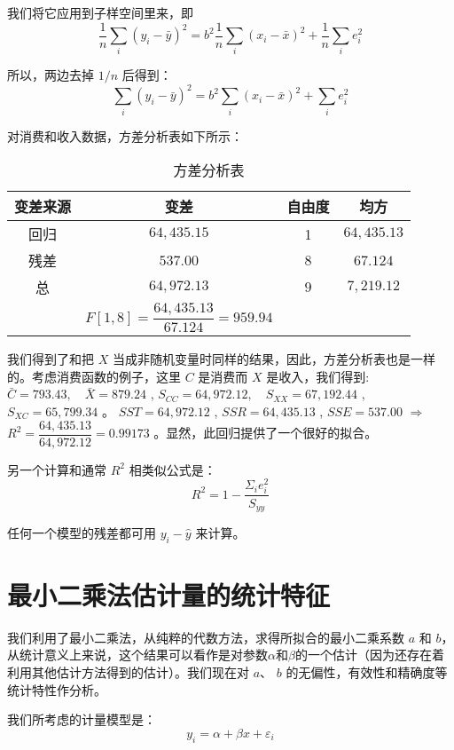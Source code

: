 我们将它应用到子样空间里来，即
$$ \frac{1}{n} \sum_{i}\left(y_{i}-\bar{y}\right)^{2}=b^{2} \frac{1}{n} \sum_{i}\left(x_{i}-\bar{x}\right)^{2}+\frac{1}{n} \sum_{i} e_{i}^{2} $$

所以，两边去掉 $ 1/n $ 后得到：
$$ \sum_{i}\left(y_{i}-\bar{y}\right)^{2}=b^{2} \sum_{i}\left(x_{i}-\bar{x}\right)^{2}+\sum_{i} e_{i}^{2} $$

对消费和收入数据，方差分析表如下所示：
\begin{table}[htb!]
    \centering
    \caption{方差分析表}
    \begin{tabular}{cccc}
        \hline 变差来源 & 变差 & 自由度 & 均方 \\
        \hline 回归 & $64,435.15$ & 1 & $ 64,435.13$ \\
        残差 & $537.00$ &  $8$ & $67.124$ \\
        总 & $64,972.13$ & $9$ & $7,219.12$  \vspace{0.3em} \\
         & $F[1, 8]=\dfrac{64,435.13}{67.124} = 959.94$ &  \vspace{ 0.5em }\\
        \hline
    \end{tabular}
 \end{table}

我们得到了和把 $X$ 当成非随机变量时同样的结果，因此，方差分析表也是一样的。考虑消费函数的例子，这里 $C$ 是消费而 $X$ 是收入，我们得到:
$\bar{C}=793.43, \quad \bar{X}=879.24$ , $S_{C C}=64,972.12, \quad S_{X X}=67,192.44$ , $S_{X C}=65,799.34 $ 。 $ SST = 64,972.12$ ,
$ SSR = 64,435.13$ , $ SSE = 537.00 $ $ \Longrightarrow $ $ R^{2} = \dfrac{64,435.13}{64,972.12} = 0.99173$ 。显然，此回归提供了一个很好的拟合。


 另一个计算和通常 $R^{2}$ 相类似公式是：
 $$ R^{2}=1-\frac{\Sigma_{i} e_{i}^{2}}{S_{y y}} $$

 任何一个模型的残差都可用 $ y_{i} − \hat{y} $ 来计算。
 \section{最小二乘法估计量的统计特征}

 我们利用了最小二乘法，从纯粹的代数方法，求得所拟合的最小二乘系数 $a$ 和 $b$，从统计意义上来说，这个结果可以看作是对参数$ \alpha $和$ \beta $的一个估计（因为还存在着利用其他估计方法得到的估计）。我们现在对 $a$、 $b$ 的无偏性，有效性和精确度等统计特性作分析。

 我们所考虑的计量模型是：
 $$ y_{i}=\alpha+\beta x+\varepsilon_{i} $$

